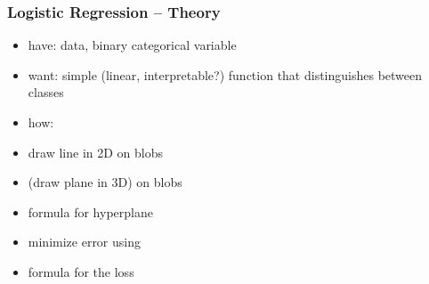 \begin{frame}
    \frametitle{Logistic Regression -- Theory}
    \begin{itemize}
        \item have: data, binary categorical variable
        \item  want: simple (linear, interpretable?) function that distinguishes between classes 
        \item  how:
        \item  draw line in 2D on blobs
        \item  (draw plane in 3D) on blobs
        \item  formula for hyperplane
        \item  minimize error using
        \item  formula for the loss
    \end{itemize}
\end{frame}

